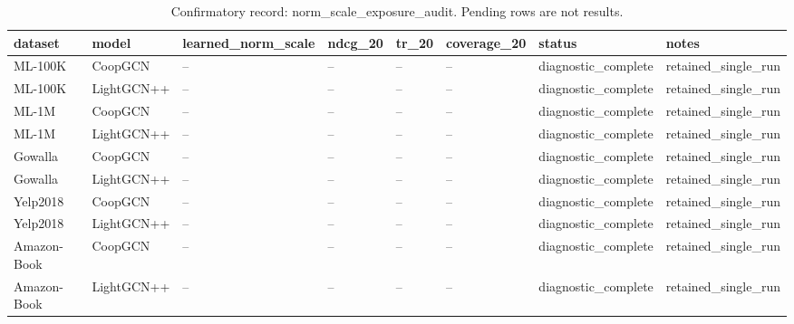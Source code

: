 \begin{table}[t]
\centering
\caption{Confirmatory record: norm\_scale\_exposure\_audit. Pending rows are not results.}
\begin{tabular}{llllllll}
\toprule
\textbf{dataset} & \textbf{model} & \textbf{learned\_norm\_scale} & \textbf{ndcg\_20} & \textbf{tr\_20} & \textbf{coverage\_20} & \textbf{status} & \textbf{notes} \\
\midrule
ML-100K & CoopGCN & -- & -- & -- & -- & diagnostic\_complete & retained\_single\_run \\
ML-100K & LightGCN++ & -- & -- & -- & -- & diagnostic\_complete & retained\_single\_run \\
ML-1M & CoopGCN & -- & -- & -- & -- & diagnostic\_complete & retained\_single\_run \\
ML-1M & LightGCN++ & -- & -- & -- & -- & diagnostic\_complete & retained\_single\_run \\
Gowalla & CoopGCN & -- & -- & -- & -- & diagnostic\_complete & retained\_single\_run \\
Gowalla & LightGCN++ & -- & -- & -- & -- & diagnostic\_complete & retained\_single\_run \\
Yelp2018 & CoopGCN & -- & -- & -- & -- & diagnostic\_complete & retained\_single\_run \\
Yelp2018 & LightGCN++ & -- & -- & -- & -- & diagnostic\_complete & retained\_single\_run \\
Amazon-Book & CoopGCN & -- & -- & -- & -- & diagnostic\_complete & retained\_single\_run \\
Amazon-Book & LightGCN++ & -- & -- & -- & -- & diagnostic\_complete & retained\_single\_run \\
\bottomrule
\end{tabular}
\end{table}
